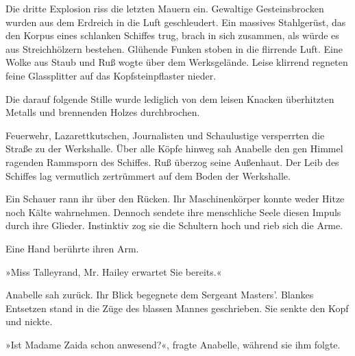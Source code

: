 Die dritte Explosion riss die letzten Mauern ein. Gewaltige
Gesteinsbrocken wurden aus dem Erdreich in die Luft geschleudert.
Ein massives Stahlgerüst, das den Korpus eines schlanken Schiffes
trug, brach in sich zusammen, als würde es aus Streichhölzern
bestehen. Glühende Funken stoben in die flirrende Luft. Eine Wolke
aus Staub und Ruß wogte über dem Werksgelände. Leise klirrend
regneten feine Glassplitter auf das Kopfsteinpflaster nieder.

Die darauf folgende Stille wurde lediglich von dem leisen Knacken
überhitzten Metalls und brennenden Holzes durchbrochen.

\tb

Feuerwehr, Lazarettkutschen, Journalisten und Schaulustige
versperrten die Straße zu der Werkshalle. Über alle Köpfe hinweg
sah Anabelle den gen Himmel ragenden Rammsporn des Schiffes. Ruß
überzog seine Außenhaut. Der Leib des Schiffes lag vermutlich
zertrümmert auf dem Boden der Werkshalle.

Ein Schauer rann ihr über den Rücken. Ihr Maschinenkörper konnte
weder Hitze noch Kälte wahrnehmen. Dennoch sendete ihre menschliche
Seele diesen Impuls durch ihre Glieder. Instinktiv zog sie die
Schultern hoch und rieb sich die Arme.

Eine Hand berührte ihren Arm.

»Miss Talleyrand, Mr. Hailey erwartet Sie bereits.«

Anabelle sah zurück. Ihr Blick begegnete dem Sergeant Masters’.
Blankes Entsetzen stand in die Züge des blassen Mannes geschrieben.
Sie senkte den Kopf und nickte.

»Ist Madame Zaida schon anwesend?«, fragte Anabelle, während sie
ihm folgte.

